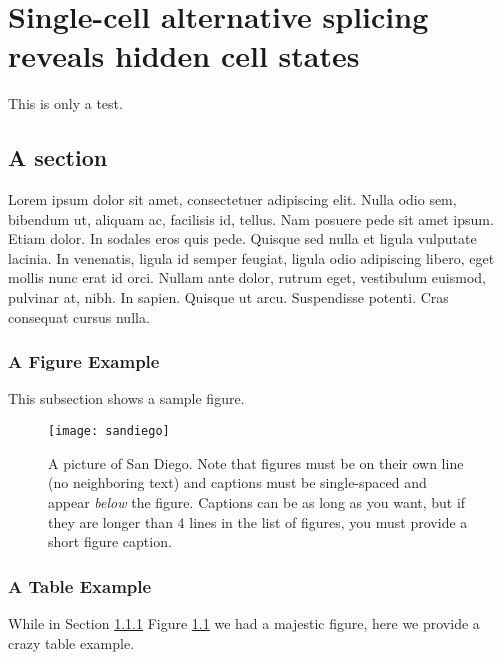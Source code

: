 \chapter{Single-cell alternative splicing reveals hidden cell states}
This is only a test.
\section{A section}
Lorem ipsum dolor sit amet, consectetuer adipiscing elit. Nulla odio
sem, bibendum ut, aliquam ac, facilisis id, tellus. Nam posuere pede
sit amet ipsum. Etiam dolor. In sodales eros quis pede.  Quisque sed
nulla et ligula vulputate lacinia. In venenatis, ligula id semper
feugiat, ligula odio adipiscing libero, eget mollis nunc erat id orci.
Nullam ante dolor, rutrum eget, vestibulum euismod, pulvinar at, nibh.
In sapien. Quisque ut arcu. Suspendisse potenti. Cras consequat cursus
nulla.

\subsection{A Figure Example}
\label{ssec:figure_example}

This subsection shows a sample figure.

\begin{figure}[h] 
  \centering
  \texttt{[image: sandiego]}
  \caption[Short figure caption (must be  lines in the list of figures)]{A picture of San Diego.  Note that figures must be on their own line (no neighboring text) and captions must be single-spaced and appear \protect\textit{below} the figure.  Captions can be as long as you want, but if they are longer than 4 lines in the list of figures, you must provide a short figure caption.} 
  \label{fig:sandiego}
\end{figure}

\subsection{A Table Example}

While in Section \ref{ssec:figure_example} Figure \ref{fig:sandiego} we had a majestic figure, here we provide a crazy table example.


